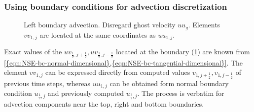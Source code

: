\documentclass{article}
\numberwithin{equation}{section}
\begin{document}
\subsubsection{Using boundary conditions for advection discretization}\label{subsubsec:advection-near-boundary}
\begin{figure}[H] %
  \caption{Left boundary advection. Disregard ghost velocity $uu_g$. Elements $vv_{1,j}$ are located at the same coordinates as $uu_{1,j}$.}\label{fig:ADV-left}
\end{figure}
Exact values of the $uv_{\frac{1}{2},j+\frac{1}{2}},uv_{\frac{1}{2},j-\frac{1}{2}}$ located at the boundary  (\cref{fig:ADV-left}) are known from \cref{{eqn:NSE-bc-normal-dimensional},{eqn:NSE-bc-tangential-dimensional}}. The element $vv_{1,j}$ can be expressed directly from computed values $v_{1,j+\frac{1}{2}},v_{1,j-\frac{1}{2}}$ of previous time steps, whereas $uu_{1,j}$ can be obtained form normal boundary condition $u_{\frac{1}{2},j}$ and previously computed $u_{\frac{3}{2},j}$. The process is verbatim for advection components near the top, right and bottom boundaries.





\end{document}
